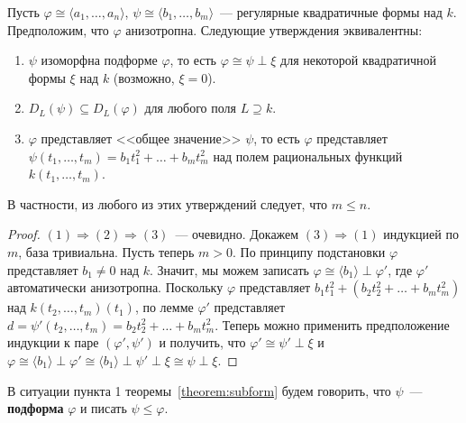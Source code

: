\documentclass[a4paper,oneside,12pt]{article}
\theoremstyle{plain} { \swapnumbers
\newtheorem{theorem}{Теорема}[subsection]
\newtheorem{corollary}[theorem]{Следствие}
\newtheorem{lemma}[theorem]{Лемма}
\newtheorem{proposition}[theorem]{Утверждение}
\newtheorem{claim}[theorem]{Факт}
}
\theoremstyle{definition} { \swapnumbers
\newtheorem{definition}[theorem]{Определение}
\newtheorem{notation}[theorem]{Обозначение}
\newtheorem{remark}[theorem]{Замечание}
\newtheorem{remarks}[theorem]{Замечания}
\newtheorem{example}[theorem]{Пример}
\newtheorem{examples}[theorem]{Примеры}
\newtheorem{sssection}[theorem]{}
}
\def\ph{\varphi}
\def\la{\langle}
\def\ra{\rangle}
\begin{document}
\begin{theorem}\label{theorem:subform}
Пусть $\ph\cong\la a_1,\dots,a_n\ra$, $\psi\cong\la b_1,\dots,b_m\ra$~--- регулярные квадратичные формы
над $k$. Предположим, что $\ph$ анизотропна. Следующие утверждения эквивалентны:
\begin{enumerate}
\item $\psi$ изоморфна подформе $\ph$, то есть $\ph\cong\psi\perp\xi$ для некоторой квадратичной формы
$\xi$ над $k$ (возможно, $\xi=0$).
\item $D_L(\psi)\subseteq D_L(\ph)$ для любого поля $L\supseteq k$.
\item $\ph$ представляет <<общее значение>> $\psi$, то есть $\ph$ представляет
$\psi(t_1,\dots,t_m)=b_1t_1^2+\dots+b_mt_m^2$ над полем рациональных функций $k(t_1,\dots,t_m)$.
\end{enumerate}
В частности, из любого из этих утверждений следует, что $m\leq n$.
\end{theorem}
\begin{proof}
$(1)\Rightarrow(2)\Rightarrow(3)$~--- очевидно. Докажем $(3)\Rightarrow(1)$ индукцией по $m$,
база тривиальна. Пусть теперь $m>0$. По принципу подстановки $\ph$ представляет $b_1\neq 0$ над $k$.
Значит, мы можем записать $\ph\cong\la b_1\ra\perp\ph'$, где $\ph'$ автоматически анизотропна.
Поскольку $\ph$ представляет $b_1t_1^2+(b_2t_2^2+\dots+b_mt_m^2)$ над $k(t_2,\dots,t_m)(t_1)$,
по лемме $\ph'$ представляет $d=\psi'(t_2,\dots,t_m)=b_2t_2^2+\dots+b_mt_m^2$.
Теперь можно применить предположение индукции к паре $(\ph',\psi')$ и получить,
что $\ph'\cong\psi'\perp\xi$ и $\ph\cong\la b_1\ra\perp\ph'\cong\la b_1\ra\perp\psi'\perp\xi\cong\psi\perp\xi$.
\end{proof}

\begin{definition}
В ситуации пункта 1 теоремы~\ref{theorem:subform} будем говорить, что $\psi$~--- {\bf подформа}
$\ph$ и писать $\psi\leq\ph$.
\end{definition}
\end{document}
